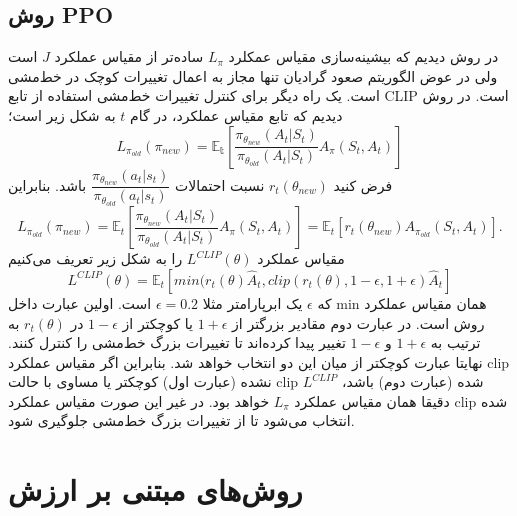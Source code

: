 \subsection{روش PPO}
در روش  دیدیم که بیشینه‌سازی مقیاس عمکلرد $L_\pi$ ساده‌تر از مقیاس عملکرد $J$ است ولی در عوض الگوریتم صعود گرادیان تنها مجاز به اعمال تغییرات کوچک در خط‌مشی است. یک راه دیگر برای کنترل تغییرات خط‌مشی استفاده از تابع CLIP است. در روش
دیدیم که تابع مقیاس عملکرد، در گام $t$ به شکل زیر است؛
$$L_{\pi_{old}}(\pi_{new}) = \mathbb{E_t}\left[\dfrac{\pi_{\theta_{new}}(A_t| S_t)}{\pi_{\theta_{old}}(A_t|S_t)} A_{\pi}(S_t, A_t)\right]$$
فرض کنید 
$r_t(\theta_{new})$
نسبت احتمالات 
$\dfrac{\pi_{\theta_{new}}(a_t|s_t)}{\pi_{\theta_{old}}(a_t|s_t)}$ باشد. بنابراین
$$L_{\pi_{old}}(\pi_{new}) = \mathbb{E}_t\left[\dfrac{\pi_{\theta_{new}}(A_t| S_t)}{\pi_{\theta_{old}}(A_t|S_t)} A_{\pi}(S_t, A_t)\right] = \mathbb{E}_t\left[r_t(\theta_{new}) A_{\pi_{old}}(S_t,A_t)\right].$$ مقیاس عملکرد  $L^{CLIP}(\theta)$ را به شکل زیر تعریف می‌کنیم
$$L^{CLIP}(\theta) = \mathbb{E}_t\left[min(r_t(\theta) \hat{A}_t, clip(r_t(\theta), 1-\epsilon, 1+\epsilon) \hat{A}_t \right]$$
که $\epsilon$ یک ابرپارامتر مثلا 
$\epsilon=0.2$
است. اولین عبارت داخل min همان مقیاس عملکرد روش  است. در عبارت دوم مقادیر بزرگتر از $1+\epsilon$ یا کوچکتر از 
$1-\epsilon$
در $r_t(\theta)$ به ترتیب به $1+\epsilon$ و $1-\epsilon$ تغییر پیدا کرده‌اند تا تغییرات بزرگ خط‌مشی را کنترل کنند. نهایتا عبارت کوچکتر از میان این دو انتخاب خواهد شد. بنابراین اگر مقیاس عملکرد clip نشده (عبارت اول) کوچکتر یا مساوی با حالت clip شده (عبارت دوم) باشد، $L^{CLIP}$ دقیقا همان مقیاس عملکرد $L_\pi$ خواهد بود. در غیر این صورت مقیاس عملکرد clip شده انتخاب می‌شود تا از تغییرات بزرگ خط‌مشی جلوگیری شود.

\section{روش‌های مبتنی بر ارزش}


